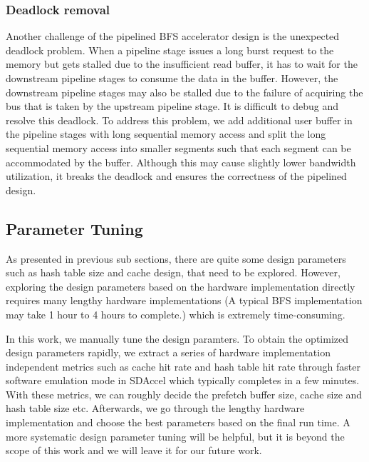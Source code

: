 \subsubsection{Deadlock removal}
Another challenge of the pipelined BFS accelerator design is the 
unexpected deadlock problem. 
When a pipeline stage issues a long burst request to the memory 
but gets stalled due to the insufficient read buffer, it has to 
wait for the downstream pipeline stages to consume the data in the buffer. 
However, the downstream pipeline stages may also be stalled due to 
the failure of acquiring the bus that is taken by the upstream pipeline stage.
It is difficult to debug and resolve this deadlock. To address this problem, we
add additional user buffer in the pipeline stages with long sequential 
memory access and split the long sequential memory access into smaller 
segments such that each segment can be accommodated by the buffer. 
Although this may cause slightly lower bandwidth utilization, it breaks the deadlock and 
ensures the correctness of the pipelined design.

\subsection{Parameter Tuning}
As presented in previous sub sections, there are quite some design 
parameters such as hash table size and cache design, 
that need to be explored. However, exploring the design parameters 
based on the hardware implementation directly requires many lengthy 
hardware implementations (A typical BFS implementation may 
take 1 hour to 4 hours to complete.) which is extremely time-consuming.

In this work, we manually tune the design paramters. To obtain the optimized 
design parameters rapidly, we extract a series of hardware implementation independent 
metrics such as cache hit rate and hash table hit rate 
through faster software emulation mode in SDAccel which typically completes in a few minutes.
With these metrics, we can roughly decide the prefetch buffer size, 
cache size and hash table size etc. Afterwards, we go through the lengthy 
hardware implementation and choose the best parameters based on the final 
run time. A more systematic design parameter tuning will be helpful, but it 
is beyond the scope of this work and we will leave it for our future work.

